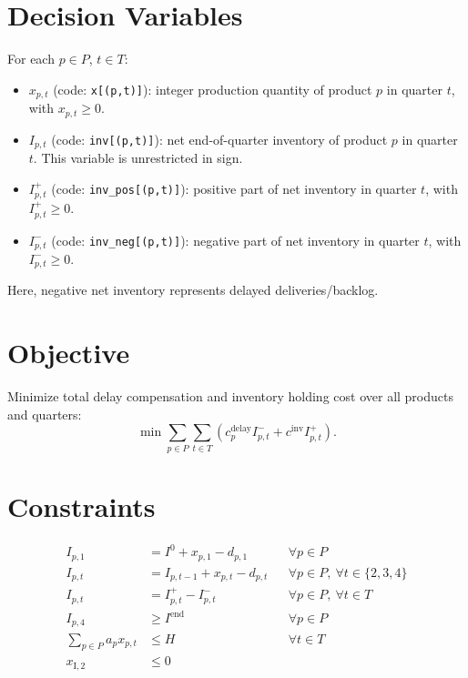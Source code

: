 \section*{Decision Variables}

For each $p \in P$, $t \in T$:

\begin{itemize}
    \item $x_{p,t}$ (code: \texttt{x[(p,t)]}): integer production quantity of product $p$ in quarter $t$, with $x_{p,t} \ge 0$.
    \item $I_{p,t}$ (code: \texttt{inv[(p,t)]}): net end-of-quarter inventory of product $p$ in quarter $t$. This variable is unrestricted in sign.
    \item $I^+_{p,t}$ (code: \texttt{inv\_pos[(p,t)]}): positive part of net inventory in quarter $t$, with $I^+_{p,t} \ge 0$.
    \item $I^-_{p,t}$ (code: \texttt{inv\_neg[(p,t)]}): negative part of net inventory in quarter $t$, with $I^-_{p,t} \ge 0$.
\end{itemize}

Here, negative net inventory represents delayed deliveries/backlog.

\section*{Objective}

Minimize total delay compensation and inventory holding cost over all products and quarters:
\[
\min \sum_{p \in P}\sum_{t \in T}
\left(
c^{\mathrm{delay}}_p I^-_{p,t}
+
c^{\mathrm{inv}} I^+_{p,t}
\right).
\]

\section*{Constraints}

\begin{align}
I_{p,1} &= I^{0} + x_{p,1} - d_{p,1}
&& \forall p \in P \label{bal1}\\
I_{p,t} &= I_{p,t-1} + x_{p,t} - d_{p,t}
&& \forall p \in P,\ \forall t \in \{2,3,4\} \label{balt}\\
I_{p,t} &= I^+_{p,t} - I^-_{p,t}
&& \forall p \in P,\ \forall t \in T \label{split}\\
I_{p,4} &\ge I^{\mathrm{end}}
&& \forall p \in P \label{endinv}\\
\sum_{p \in P} a_p x_{p,t} &\le H
&& \forall t \in T \label{hours}\\
x_{\mathrm{I},2} &\le 0 \label{noq2}
\end{align}


